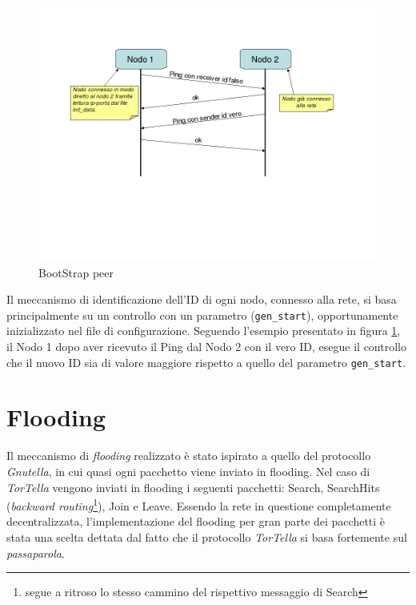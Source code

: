 \begin{figure}[H]
\begin{center}
\includegraphics[scale=0.5]{etc/Bootstrap.png}
\caption{BootStrap peer}
\label{bootstrap}
\end{center}
\end{figure}
Il meccanismo di identificazione dell'ID di ogni nodo, connesso alla rete, si basa principalmente su un controllo con un parametro (\texttt{gen\_start}), opportunamente inizializzato nel file di configurazione. Seguendo l'esempio presentato in figura \ref{bootstrap}, il Nodo 1 dopo aver ricevuto il Ping dal Nodo 2 con il vero ID, esegue il controllo che il nuovo ID sia di valore maggiore rispetto a quello del parametro \texttt{gen\_start}.
\section{Flooding}
Il meccanismo di \textit{flooding} realizzato è stato ispirato a quello del protocollo \textit{Gnutella}, in cui quasi ogni pacchetto viene inviato in flooding. Nel caso di \textit{TorTella} vengono inviati in flooding i seguenti pacchetti: Search, SearchHits (\textit{backward routing}\footnote{segue a ritroso lo stesso cammino del rispettivo messaggio di Search}), Join e Leave. Essendo la rete in questione completamente decentralizzata, l'implementazione del flooding per gran parte dei pacchetti è stata una scelta dettata dal fatto che il protocollo \textit{TorTella} si basa fortemente sul \textit{passaparola}.
